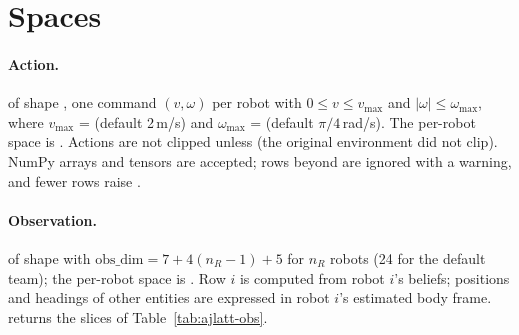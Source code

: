 \section{Spaces}\label{sec:ajlatt-spaces}

\paragraph{Action.}  of shape , one command
$(v, \omega)$ per robot with $0 \le v \le v_{\max}$ and
$|\omega| \le \omega_{\max}$, where $v_{\max}$ =
 (default 2\,m/s) and $\omega_{\max}$ =
 (default $\pi/4$\,rad/s). The per-robot space
is . Actions are not clipped unless
 (the original environment did not clip). NumPy arrays
and tensors are accepted; rows beyond  are ignored with a
warning, and fewer rows raise .

\paragraph{Observation.}  of shape 
with $\text{obs\_dim} = 7 + 4(n_R - 1) + 5$ for $n_R$ robots (24 for the
default team); the per-robot space is .
Row $i$ is computed from robot $i$'s beliefs; positions and headings of other
entities are expressed in robot $i$'s estimated body frame.
 returns the slices of
Table~\ref{tab:ajlatt-obs}.

